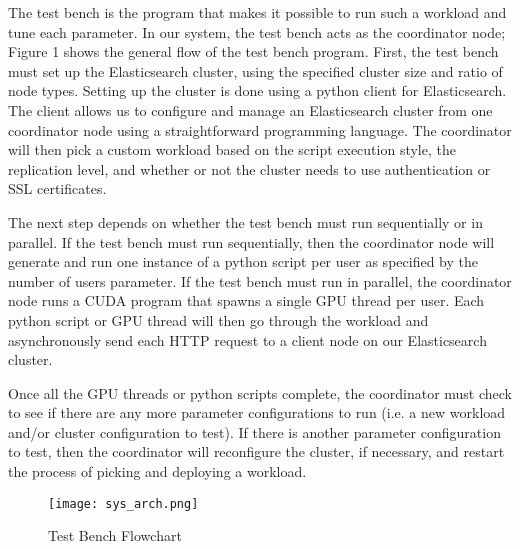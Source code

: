 \documentclass[journal]{IEEEtran}
\begin{document}
The test bench is the program that makes it possible to run such a workload and tune each parameter. In our system, the test bench acts as the coordinator node; Figure 1 shows the general flow of the test bench program. First, the test bench must set up the Elasticsearch cluster, using the specified cluster size and ratio of node types. Setting up the cluster is done using a python client for Elasticsearch. The client allows us to configure and manage an Elasticsearch cluster from one coordinator node using a straightforward programming language. The coordinator will then pick a custom workload based on the script execution style, the replication level, and whether or not the cluster needs to use authentication or SSL certificates.

The next step depends on whether the test bench must run sequentially or in parallel. If the test bench must run sequentially, then the coordinator node will generate and run one instance of a python script per user as specified by the number of users parameter. If the test bench must run in parallel, the coordinator node runs a CUDA program that spawns a single GPU thread per user. Each python script or GPU thread will then go through the workload and asynchronously send each HTTP request to a client node on our Elasticsearch cluster.

Once all the GPU threads or python scripts complete, the coordinator must check to see if there are any more parameter configurations to run (i.e. a new workload and/or cluster configuration to test). If there is another parameter configuration to test, then the coordinator will reconfigure the cluster, if necessary, and restart the process of picking and deploying a workload.


\begin{figure}
  \centering
  \texttt{[image: sys\_arch.png]}
  \caption{Test Bench Flowchart}
\end{figure}




\end{document}
